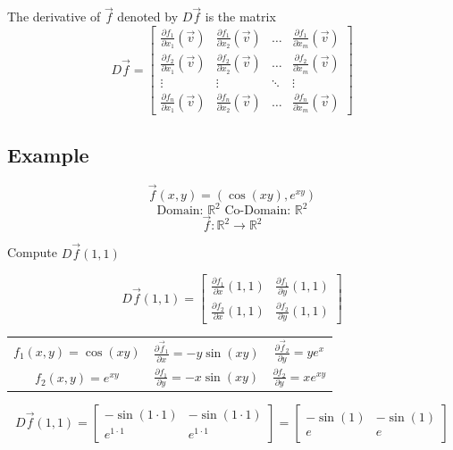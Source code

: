 \documentclass{article}
\begin{document}
The derivative of $\vec{f}$ denoted by $D\vec{f}$ is the matrix
\[\textit{D}\vec{f}=
\begin{bmatrix}
    \frac{\partial f_1}{\partial x_1}(\vec{v})&\frac{\partial f_1}{\partial x_2}(\vec{v})&\ldots&\frac{\partial f_1}{\partial x_m}(\vec{v})\\[6pt]
    \frac{\partial f_2}{\partial x_1}(\vec{v})&\frac{\partial f_2}{\partial x_2}(\vec{v})&\ldots&\frac{\partial f_2}{\partial x_m}(\vec{v})\\[6pt]
    \vdots&\vdots&\ddots&\vdots\\[6pt]
    \frac{\partial f_n}{\partial x_1}(\vec{v})&\frac{\partial f_n}{\partial x_2}(\vec{v})&\ldots&\frac{\partial f_n}{\partial x_m}(\vec{v})
\end{bmatrix}\]

\subsection*{Example}
\[\vec{f}(x,y)=(\cos (xy),e^{xy})\]
\[\mbox{Domain: $\mathbb{R}^2$ Co-Domain: $\mathbb{R}^2$}\]
\[\vec{f}:\mathbb{R}^2 \rightarrow\mathbb{R}^2\]

Compute $D\vec{f}(1,1)$

\[D\vec{f}(1,1)=\begin{bmatrix}
    \frac{\partial f_1}{\partial x}(1,1)&\frac{\partial f_1}{\partial y}(1,1)\\[6pt]
    \frac{\partial f_2}{\partial x}(1,1)&\frac{\partial f_2}{\partial y}(1,1)
\end{bmatrix}\]



\begin{center}
    \begin{tabular}{ c c c }
     $f_{1}(x,y)=\cos (xy)$ & $\frac{\partial \vec{f}_1}{\partial x}=-y\sin (xy)$ & $\frac{\partial \vec{f}_2}{\partial y}=y e^x$ \\[6pt]
     
     $f_{2}(x,y)=e^{xy}$ & $\frac{\partial f_1}{\partial y}=-x\sin (xy)$ & $\frac{\partial f_2}{\partial y}=xe^{xy}$ 
    \end{tabular}
\end{center}

\[D\vec{f}(1,1)=\begin{bmatrix}
    -\sin (1\cdot 1)&-\sin (1\cdot 1)\\
    e^{1\cdot 1}& e^{1\cdot 1}
\end{bmatrix}=\begin{bmatrix}
    -\sin (1)&-\sin (1)\\
    e&e
\end{bmatrix}\]
    
\end{document}
